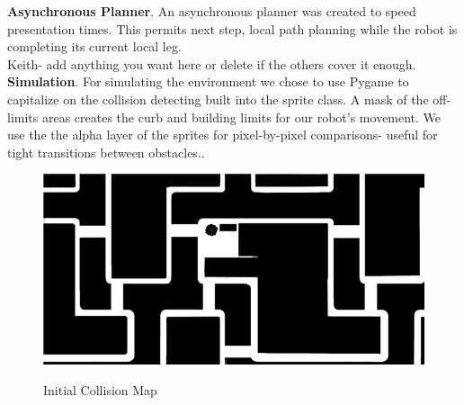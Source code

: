 \documentclass{article}
\begin{document}
\begin{multicols}{2}
\noindent \textbf{Asynchronous Planner}. An asynchronous planner was created to speed presentation times.  This permits next step, local path planning while the robot is completing its current local leg.  \\
\noindent Keith- add anything you want here or delete if the others cover it enough.\\

\noindent \textbf{Simulation}. For simulating the environment we chose to use Pygame to capitalize on the collision detecting built into the sprite class.  A mask of the off-limits areas creates the curb and building limits for our robot's movement. We use the the alpha layer of the sprites for pixel-by-pixel comparisons- useful for tight transitions between obstacles..\
\begin{figure}[H]
   \centering
    \includegraphics[width = 1\columnwidth]{figures/mask.png}
     \label{fig:mask}
     \caption{Initial Collision Map}
\end{figure}


\end{multicols}
\end{document}
